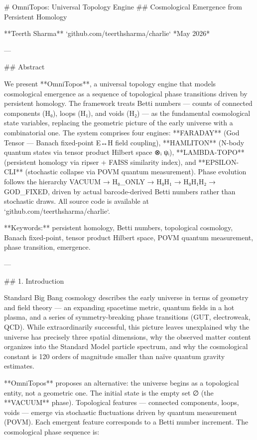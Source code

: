 # OmniTopos: Universal Topology Engine
## Cosmological Emergence from Persistent Homology

**Teerth Sharma**  
`github.com/teerthsharma/charlie`  
*May 2026*

---

## Abstract

We present **OmniTopos**, a universal topology engine that models cosmological emergence as a sequence of topological phase transitions driven by persistent homology.  The framework treats Betti numbers — counts of connected components (H₀), loops (H₁), and voids (H₂) — as the fundamental cosmological state variables, replacing the geometric picture of the early universe with a combinatorial one.  The system comprises four engines: **FARADAY** (God Tensor — Banach fixed-point E↔H field coupling), **HAMLITON** (N-body quantum states via tensor product Hilbert space ⊗ᵢ ψᵢ), **LAMBDA-TOPO** (persistent homology via ripser + FAISS similarity index), and **EPSILON-CLI** (stochastic collapse via POVM quantum measurement).  Phase evolution follows the hierarchy VACUUM → H₀_ONLY → H₀H₁ → H₀H₁H₂ → GOD_FIXED, driven by actual barcode-derived Betti numbers rather than stochastic draws.  All source code is available at `github.com/teerthsharma/charlie`.

**Keywords:** persistent homology, Betti numbers, topological cosmology, Banach fixed-point, tensor product Hilbert space, POVM quantum measurement, phase transition, emergence.

---

## 1. Introduction

Standard Big Bang cosmology describes the early universe in terms of geometry and field theory — an expanding spacetime metric, quantum fields in a hot plasma, and a series of symmetry-breaking phase transitions (GUT, electroweak, QCD).  While extraordinarily successful, this picture leaves unexplained why the universe has precisely three spatial dimensions, why the observed matter content organizes into the Standard Model particle spectrum, and why the cosmological constant is 120 orders of magnitude smaller than naïve quantum gravity estimates.

**OmniTopos** proposes an alternative: the universe begins as a topological entity, not a geometric one.  The initial state is the empty set ∅ (the **VACUUM** phase).  Topological features — connected components, loops, voids — emerge via stochastic fluctuations driven by quantum measurement (POVM).  Each emergent feature corresponds to a Betti number increment.  The cosmological phase sequence is:

